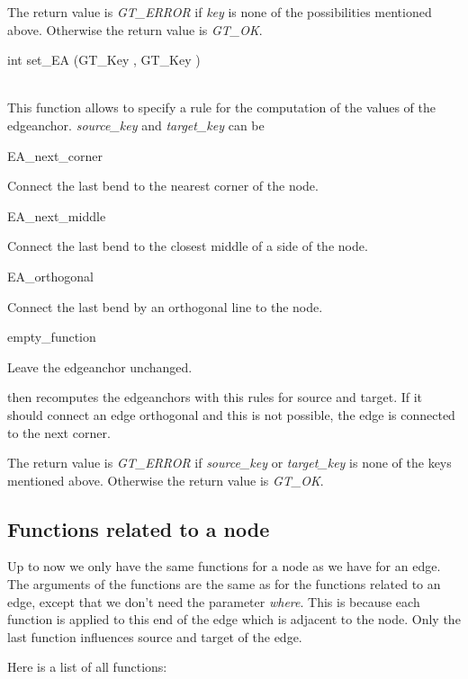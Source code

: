 \documentclass[twoside,fleqn]{report}
\begin{document}
\begin{Cdefinition}
    The return value is \emph{GT\_ERROR} if \emph{key} is none of the 
    possibilities mentioned above. Otherwise the return value is \emph{GT\_OK}.

  \item[int set\_EA (GT\_Key \Param{source\_key}, 
    GT\_Key \Param{target\_key})] \strut\\
    This function allows to specify a rule for the computation of the values
    of the edgeanchor. \emph{source\_key} and \emph{target\_key} can be

    \begin{ttdescription}
    \item[EA\_next\_corner] \strut 
      Connect the last bend to the nearest corner of the node.
    \item[EA\_next\_middle] \strut 
      Connect the last bend to the closest middle of a side of the node.
    \item[EA\_orthogonal] \strut
      Connect the last bend by an orthogonal line to the node.
    \item[empty\_function] \strut
      Leave the edgeanchor unchanged.
    \end{ttdescription}
  
    \Graphlet{} then recomputes the edgeanchors with this rules for source
    and target. If it should connect an edge orthogonal and this is not 
    possible, the edge is connected to the next corner.

    The return value is \emph{GT\_ERROR} if \emph{source\_key} or 
    \emph{target\_key} is none of the keys mentioned above.
    Otherwise the return value is \emph{GT\_OK}.

\end{Cdefinition}

\subsection{Functions related to a node}

Up to now we only have the same functions for a node as we have for an edge.
The arguments of the functions are the same as for the functions related 
to an edge, except that we don't need the parameter \emph{where}. 
This is because each function is applied to this end of the edge which is
adjacent to the node. 
Only the last function influences source and target of the edge.

Here is a list of all functions:
\end{document}
